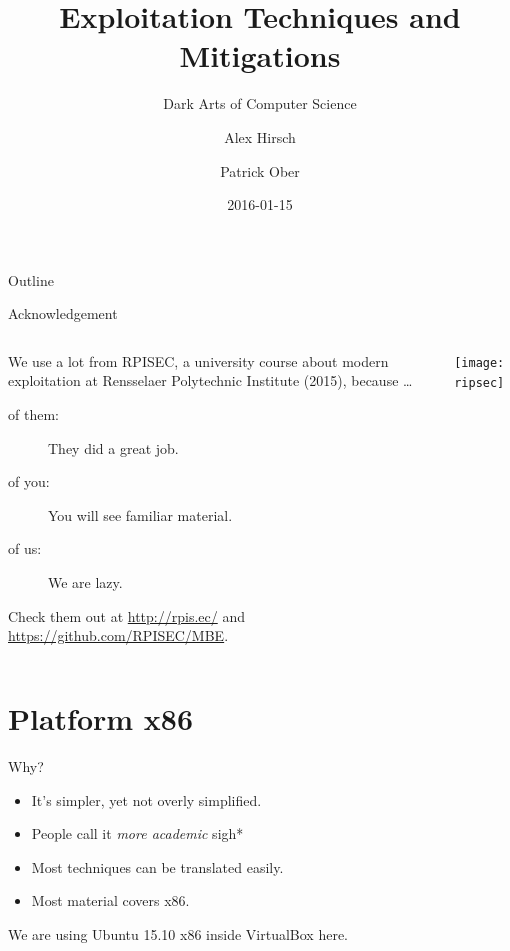 \documentclass[beamer]{uibk}
\title{Exploitation Techniques and Mitigations}
\subtitle{Dark Arts of Computer Science}
\author{Alex Hirsch \and Patrick Ober}
\date{2016-01-15}
\begin{document}
\maketitle

\begin{frame}{Outline}
    \begin{multicols}{2}
        \tableofcontents
    \end{multicols}
\end{frame}

\begin{frame}{Acknowledgement}
    \begin{columns}
        \begin{column}{0.5\textwidth}
            We use a lot from RPISEC, a university course about modern
            exploitation at Rensselaer Polytechnic Institute (2015), because
            \dots

            \begin{description}
                \item[of them:] They did a great job.
                \item[of you:] You will see familiar material.
                \item[of us:] We are lazy.
            \end{description}

            Check them out at \url{http://rpis.ec/} and
            \url{https://github.com/RPISEC/MBE}.
        \end{column}
        \begin{column}{0.5\textwidth}
            \texttt{[image: ripsec]}
        \end{column}
    \end{columns}
\end{frame}

\section{Platform x86}

\begin{frame}{Why?}
    \begin{itemize}
        \item It's simpler, yet not overly simplified.
        \item People call it \emph{more academic} \quad *sigh*
        \item Most techniques can be translated easily.
        \item Most material covers x86.
    \end{itemize}
    \bigskip
    We are using Ubuntu 15.10 x86 inside VirtualBox here.
\end{frame}
\end{document}
